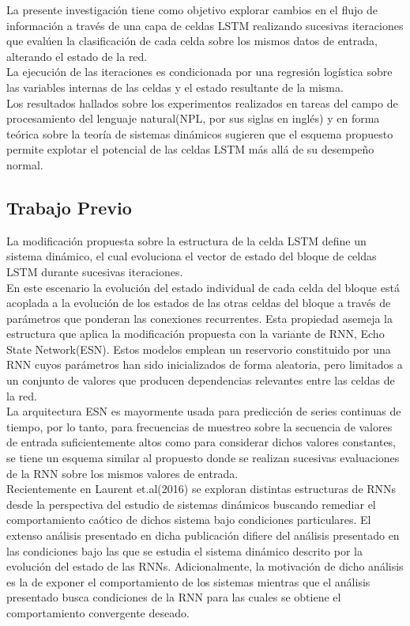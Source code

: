 \documentclass{article}
\begin{document}
	La presente investigación tiene como objetivo explorar cambios en el flujo de información a través de una capa de celdas LSTM realizando sucesivas iteraciones que evalúen la clasificación de cada celda sobre los mismos datos de entrada, alterando el estado de la red. \\
	La ejecución de las iteraciones es condicionada por una regresión logística sobre las variables internas de las celdas y el estado resultante de la misma.\\
	
	Los resultados hallados sobre los experimentos realizados en tareas del campo de procesamiento del lenguaje natural(NPL, por sus siglas en inglés) y en forma teórica sobre la teoría de sistemas dinámicos sugieren que el esquema propuesto permite explotar el potencial de las celdas LSTM más allá de su desempeño normal.
	
	\subsection{Trabajo Previo}
	La modificación propuesta sobre la estructura de la celda LSTM define un sistema dinámico, el cual evoluciona el vector de estado del bloque de celdas LSTM durante sucesivas iteraciones. \\
	En este escenario la evolución del estado individual de cada celda del bloque está acoplada a la evolución de los estados de las otras celdas del bloque a través de parámetros que ponderan las conexiones recurrentes. Esta propiedad asemeja la estructura que aplica la modificación propuesta con la variante de RNN, Echo State Network(ESN). Estos modelos emplean un reservorio constituido por una RNN cuyos parámetros han sido inicializados de forma aleatoria, pero limitados a un conjunto de valores que producen dependencias relevantes entre las celdas de la red.\\
	La arquitectura ESN es mayormente usada para predicción de series continuas de tiempo, por lo tanto, para frecuencias de muestreo sobre la secuencia de valores de entrada suficientemente altos como para considerar dichos valores constantes, se tiene un esquema similar al propuesto donde se realizan sucesivas evaluaciones de la RNN sobre los mismos valores de entrada.\\
	
	Recientemente en Laurent et.al(2016)\cite{11Laurent} se exploran distintas estructuras de RNNs desde la perspectiva del estudio de sistemas dinámicos buscando remediar el comportamiento caótico de dichos sistema bajo condiciones particulares. El extenso análisis presentado en dicha publicación difiere del análisis presentado en las condiciones bajo las que se estudia el sistema dinámico descrito por la evolución del estado de las RNNs. Adicionalmente, la motivación de dicho análisis es la de exponer el comportamiento de los sistemas mientras que el análisis presentado busca condiciones de la RNN para las cuales se obtiene el comportamiento convergente deseado.\\
	
\end{document}

